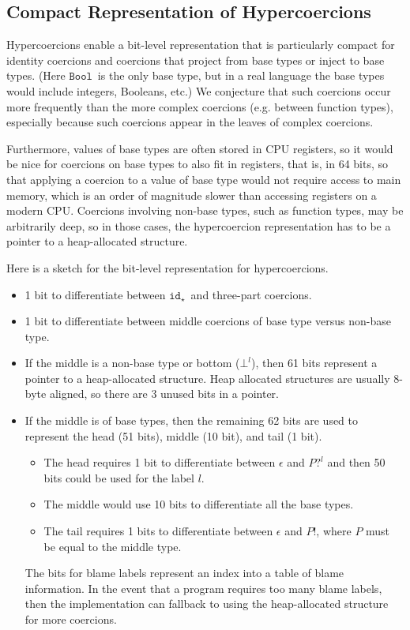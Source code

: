 \documentclass[runningheads]{llncs}
\newcommand{\Tdyn}[0]{\ensuremath{\star}}
\newcommand{\Pbool}[0]{\ensuremath{\mathtt{Bool}}}
\newcommand{\cnfid}[1]{\ensuremath{\mathtt{id}_{#1}}}
\newcommand{\hcci}[0]{\cnfid{\Tdyn}}
\newcommand{\hche}[0]{\ensuremath{\epsilon}}
\newcommand{\hchp}[2]{\ensuremath{#1?^{#2}}}
\newcommand{\hcmfail}[1]{\ensuremath{\bot^l}}
\newcommand{\hcte}[0]{\ensuremath{\epsilon}}
\newcommand{\hcti}[1]{\ensuremath{#1!}}
\begin{document}
\subsection{Compact Representation of Hypercoercions} \label{sec:hypercoercions-compact}

Hypercoercions enable a bit-level representation that is particularly
compact for identity coercions and coercions that project from base
types or inject to base types.  (Here \Pbool\ is the only base
type, but in a real language the base types would include integers,
Booleans, etc.)  We conjecture that such coercions occur more
frequently than the more complex coercions (e.g. between function
types), especially because such coercions appear in the leaves of
complex coercions.

Furthermore, values of base types are often stored in CPU registers, so
it would be nice for coercions on base types to also fit in registers,
that is, in 64 bits, so that applying a coercion to a value of base
type would not require access to main memory, which is an order of
magnitude slower than accessing registers on a modern CPU.
%
Coercions involving non-base types, such as function types, may be
arbitrarily deep, so in those cases, the hypercoercion representation
has to be a pointer to a heap-allocated structure.

Here is a sketch for the bit-level representation for hypercoercions.

\begin{itemize}
\item 1 bit to differentiate between \hcci\ and three-part coercions.

\item 1 bit to differentiate between middle coercions of base type
versus non-base type.

\item If the middle is a non-base type or bottom ($\hcmfail{l}$), then 61 bits 
represent a
pointer to a heap-allocated structure. Heap allocated structures are
usually 8-byte aligned, so there are 3 unused bits in a pointer.

\item If the middle is of base types, then the remaining 62 bits are
used to represent the head (51 bits), middle (10 bit), and tail (1
bit).
\begin{itemize}
\item The head requires 1 bit to differentiate between $\hche$
and $\hchp{P}{l}$ and then 50 bits could be used for the label $l$.
\item The middle would use 10 bits to differentiate all the base types.
\item The tail requires 1 bits to differentiate between $\hcte$ and $\hcti{P}$, 
where $P$ must be equal to the middle type.
\end{itemize}
The bits for blame labels represent an index into a table of blame information.
In the event that a program requires too many blame labels, then the 
implementation
can fallback to using the heap-allocated structure for more
coercions.
\end{itemize}
\end{document}
